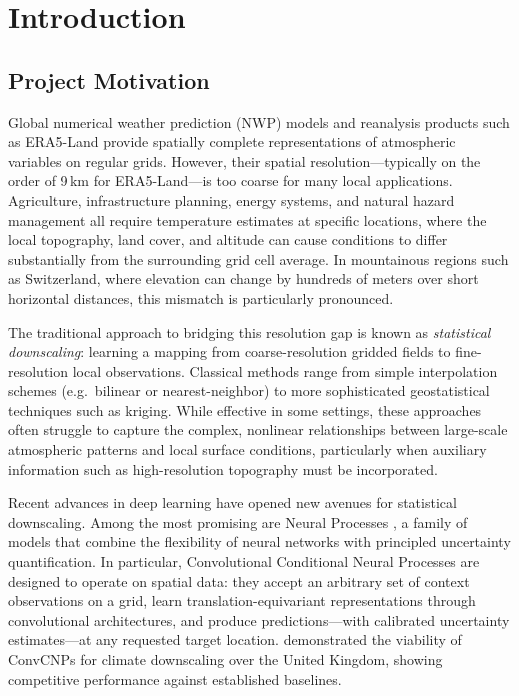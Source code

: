 
\chapter{Introduction}
\section{Project Motivation}

Global numerical weather prediction (NWP) models and reanalysis products such as ERA5-Land provide spatially complete representations of atmospheric variables on regular grids. However, their spatial resolution---typically on the order of 9\,km for ERA5-Land---is too coarse for many local applications. Agriculture, infrastructure planning, energy systems, and natural hazard management all require temperature estimates at specific locations, where the local topography, land cover, and altitude can cause conditions to differ substantially from the surrounding grid cell average. In mountainous regions such as Switzerland, where elevation can change by hundreds of meters over short horizontal distances, this mismatch is particularly pronounced.

The traditional approach to bridging this resolution gap is known as \textit{statistical downscaling}: learning a mapping from coarse-resolution gridded fields to fine-resolution local observations. Classical methods range from simple interpolation schemes (e.g.\ bilinear or nearest-neighbor) to more sophisticated geostatistical techniques such as kriging. While effective in some settings, these approaches often struggle to capture the complex, nonlinear relationships between large-scale atmospheric patterns and local surface conditions, particularly when auxiliary information such as high-resolution topography must be incorporated.

Recent advances in deep learning have opened new avenues for statistical downscaling. Among the most promising are Neural Processes \citep[NPs;][]{garnelo2018np}, a family of models that combine the flexibility of neural networks with principled uncertainty quantification. In particular, Convolutional Conditional Neural Processes \citep[ConvCNPs;][]{gordon2019} are designed to operate on spatial data: they accept an arbitrary set of context observations on a grid, learn translation-equivariant representations through convolutional architectures, and produce predictions---with calibrated uncertainty estimates---at any requested target location. \citet{vaughan2022} demonstrated the viability of ConvCNPs for climate downscaling over the United Kingdom, showing competitive performance against established baselines.

